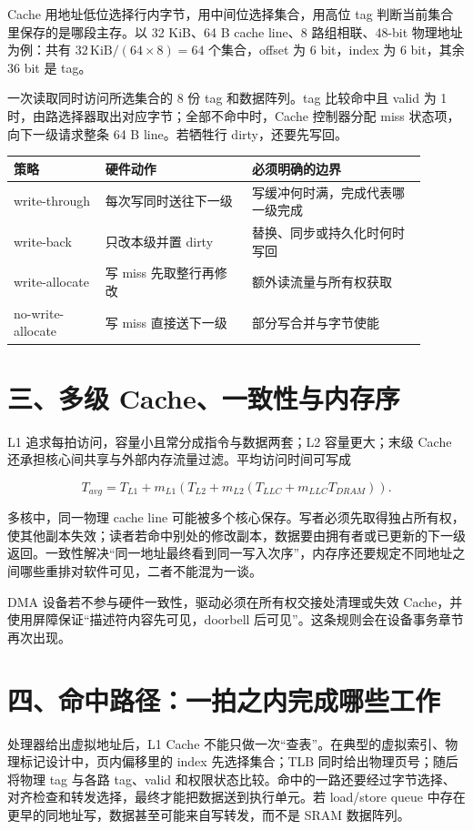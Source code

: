 Cache 用地址低位选择行内字节，用中间位选择集合，用高位 tag 判断当前集合里保存的是哪段主存。以 32 KiB、64 B cache line、8 路组相联、48-bit 物理地址为例：共有 $32\,\text{KiB}/(64\times8)=64$ 个集合，offset 为 6 bit，index 为 6 bit，其余 36 bit 是 tag。

一次读取同时访问所选集合的 8 份 tag 和数据阵列。tag 比较命中且 valid 为 1 时，由路选择器取出对应字节；全部不命中时，Cache 控制器分配 miss 状态项，向下一级请求整条 64 B line。若牺牲行 dirty，还要先写回。

\begin{longtable}{L{0.2\linewidth}L{0.32\linewidth}L{0.38\linewidth}}
\toprule
策略 & 硬件动作 & 必须明确的边界 \\
\midrule
write-through & 每次写同时送往下一级 & 写缓冲何时满，完成代表哪一级完成 \\\tablerowrule
write-back & 只改本级并置 dirty & 替换、同步或持久化时何时写回 \\\tablerowrule
write-allocate & 写 miss 先取整行再修改 & 额外读流量与所有权获取 \\\tablerowrule
no-write-\allowbreak allocate & 写 miss 直接送下一级 & 部分写合并与字节使能 \\
\bottomrule
\end{longtable}

\section{三、多级 Cache、一致性与内存序}

L1 追求每拍访问，容量小且常分成指令与数据两套；L2 容量更大；末级 Cache 还承担核心间共享与外部内存流量过滤。平均访问时间可写成

\[
T_{avg}=T_{L1}+m_{L1}(T_{L2}+m_{L2}(T_{LLC}+m_{LLC}T_{DRAM})).
\]

多核中，同一物理 cache line 可能被多个核心保存。写者必须先取得独占所有权，使其他副本失效；读者若命中别处的修改副本，数据要由拥有者或已更新的下一级返回。一致性解决“同一地址最终看到同一写入次序”，内存序还要规定不同地址之间哪些重排对软件可见，二者不能混为一谈。

DMA 设备若不参与硬件一致性，驱动必须在所有权交接处清理或失效 Cache，并使用屏障保证“描述符内容先可见，doorbell 后可见”。这条规则会在设备事务章节再次出现。

\section{四、命中路径：一拍之内完成哪些工作}

处理器给出虚拟地址后，L1 Cache 不能只做一次“查表”。在典型的虚拟索引、物理标记设计中，页内偏移里的 index 先选择集合；TLB 同时给出物理页号；随后将物理 tag 与各路 tag、valid 和权限状态比较。命中的一路还要经过字节选择、对齐检查和转发选择，最终才能把数据送到执行单元。若 load/store queue 中存在更早的同地址写，数据甚至可能来自写转发，而不是 SRAM 数据阵列。

